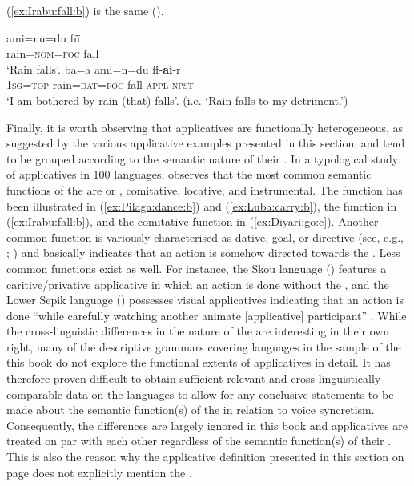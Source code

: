(\ref{ex:Irabu:fall:b}) is the same ().

\ea {} \citep[495]{shimoji:2008}
\ea\label{ex:Irabu:fall:a}
	\gll	ami=nu=du 				fïï 	\\
			rain=\textsc{nom=foc} 	fall 	\\
	\glt	‘Rain falls’.
\ex\label{ex:Irabu:fall:b}
	\gll	ba=a 				ami=n=du 				ff-\textbf{ai}-r 		\\
			\textsc{1sg=top} 	rain=\textsc{dat=foc} 	fall-\textsc{appl-npst}	\\
	\glt	‘I am bothered by rain (that) falls’. (i.e. ‘Rain falls to my detriment.')
	\z 
\z

Finally, it is worth observing that applicatives are functionally heterogeneous, as suggested by the various applicative examples presented in this section, and tend to be grouped according to the semantic nature of their . In a typological study of applicatives in 100 languages, \cite[202f.]{peterson:2007} observes that the most common semantic functions of the  are  or , comitative, locative, and instrumental. The  function has been illustrated in  (\ref{ex:Pilaga:dance:b}) and  (\ref{ex:Luba:carry:b}), the  function in  (\ref{ex:Irabu:fall:b}), and the comitative function in  (\ref{ex:Diyari:go:c}). Another common function is variously characterised as dative, goal, or directive (see, e.g., \citealt[1135]{haspelmath:muller-bardey:2004}; \citealt[187]{peterson:2007}) and basically indicates that an action is somehow directed towards the . Less common functions exist as well. For instance, the Skou language  () features a caritive/privative applicative in which an action is done without the  \citep[258f.]{corris:2005}, and the Lower Sepik language  () possesses visual applicatives indicating that an action is done “while carefully watching another animate [applicative] participant” \citep[315]{foley:1991}. While the cross-linguistic differences in the nature of the  are interesting in their own right, many of the descriptive grammars covering languages in the sample of the this book do not explore the functional extents of applicatives in detail. It has therefore proven difficult to obtain sufficient relevant and cross-linguistically comparable data on the languages to allow for any conclusive statements to be made about the semantic function(s) of the  in relation to voice syncretism. Consequently, the differences are largely ignored in this book and applicatives are treated on par with each other regardless of the semantic function(s) of their . This is also the reason why the applicative definition presented in this section on page \pageref{def:applicative} does not explicitly mention the .

